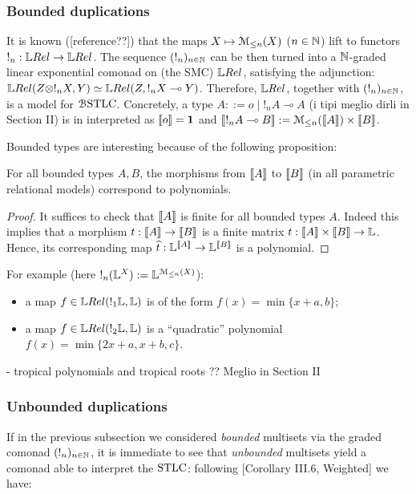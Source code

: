 \subsubsection{Bounded duplications}

It is known ([reference??]) that the maps $X\mapsto \mathcal{M}_{\leq n}(X)$ ($n\in\mathbb{N}$) lift to functors $!_n:\LREL\to\LREL$.
The sequence $(!_n)_{n\in\mathbb{N}}$ can be then turned into a $\mathbb{N}$-graded linear exponential comonad on (the SMC) $\LREL$, satisfying the adjunction:
$\LREL(Z\otimes !_{n}X,Y) \simeq \LREL(Z, !_{n}X\multimap Y)$.
Therefore, $\LREL$, together with $(!_n)_{n\in\mathbb{N}}$, is a model for $\mathcal{B}\mathrm{STLC}$. 
Concretely, a type $A::= o \mid !_{n}A \multimap A$ (i tipi meglio dirli in Section II) is in interpreted as $\llbracket o\rrbracket=\mathbf{1}$ and 
$\llbracket!_{n}A\multimap B\rrbracket:= \mathcal{M}_{\leq n}(\llbracket A\rrbracket) \times \llbracket B\rrbracket$.

Bounded types are interesting because of the following proposition:
\begin{proposition}
For all bounded types $A,B$, the morphisms from $\llbracket A\rrbracket$ to $\llbracket B\rrbracket$ (in all parametric relational models) correspond to polynomials.
\end{proposition}
\begin{proof}
It suffices to check that $\llbracket A\rrbracket$ is finite for all bounded types $A$. Indeed this implies that a morphism $t:\llbracket A\rrbracket\to \llbracket B\rrbracket$ is a finite matrix $t: \llbracket A\rrbracket \times \llbracket B\rrbracket \to \mathbb{L}$.
Hence, its corresponding map $\widehat t:\mathbb{L}^{\llbracket A\rrbracket} \to \mathbb{L}^{\llbracket B\rrbracket}$ is a polynomial.
\end{proof}

For example (here $!_{n}(\mathbb{L}^{X}):= \mathbb{L}^{\mathcal{M}_{\leq n}(X)}$):
\begin{itemize}
\item a map $f\in \LREL( !_{1}\Lawv, \Lawv)$ is of the form $f(x)=\min \{x+a,b\}$;
\item a map $f\in \LREL(!_{2}\Lawv, \Lawv)$ is a ``quadratic'' polynomial $f(x)=\min\{2x+a, x+b, c\}$.
\end{itemize}

- tropical polynomials and tropical roots ?? Meglio in Section II

\subsubsection{Unbounded duplications}

If in the previous subsection we considered \emph{bounded} multisets via the graded comonad $(!_n)_{n\in\mathbb{N}}$, it is immediate to see that \emph{unbounded} multisets yield a comonad able to interpret the $\mathrm{STLC}$:
following [Corollary III.6, Weighted] we have:


